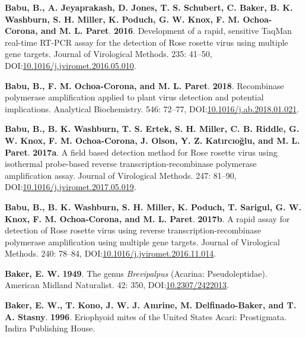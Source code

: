 \documentclass[12pt,final,CPage]{ufthesis}
\newlength{\cslhangindent}
\newenvironment{CSLReferences}[2] %
{%
	\setlength{\parindent}{0pt}
	\ifodd #1 \everypar{\setlength{\hangindent}{\cslhangindent}}\ignorespaces\fi
	\ifnum #2 > 0
	\setlength{\parskip}{#2\baselineskip}
	\fi
}%
{}
\begin{document}
{\begin{CSLReferences}{1}{0}
  \leavevmode{}%
  \textbf{Babu, B., A. Jeyaprakash, D. Jones, T. S. Schubert, C. Baker, B. K. Washburn, S. H. Miller, K. Poduch, G. W. Knox, F. M. Ochoa-Corona, and M. L. Paret}. \textbf{2016}. Development of a rapid, sensitive {TaqMan} real-time {RT}-{PCR} assay for the detection of {Rose rosette virus} using multiple gene targets. Journal of Virological Methods. 235: 41--50, DOI:\href{https://doi.org/10.1016/j.jviromet.2016.05.010}{10.1016/j.jviromet.2016.05.010}.

  \leavevmode{}%
  \textbf{Babu, B., F. M. Ochoa-Corona, and M. L. Paret}. \textbf{2018}. Recombinase polymerase amplification applied to plant virus detection and potential implications. Analytical Biochemistry. 546: 72--77, DOI:\href{https://doi.org/10.1016/j.ab.2018.01.021}{10.1016/j.ab.2018.01.021}.

  \leavevmode{}%
  \textbf{Babu, B., B. K. Washburn, T. S. Ertek, S. H. Miller, C. B. Riddle, G. W. Knox, F. M. Ochoa-Corona, J. Olson, Y. Z. Katırcıoğlu, and M. L. Paret}. \textbf{2017a}. A field based detection method for {Rose rosette virus} using isothermal probe-based reverse transcription-recombinase polymerase amplification assay. Journal of Virological Methods. 247: 81--90, DOI:\href{https://doi.org/10.1016/j.jviromet.2017.05.019}{10.1016/j.jviromet.2017.05.019}.

  \leavevmode{}%
  \textbf{Babu, B., B. K. Washburn, S. H. Miller, K. Poduch, T. Sarigul, G. W. Knox, F. M. Ochoa-Corona, and M. L. Paret}. \textbf{2017b}. A rapid assay for detection of {Rose rosette virus} using reverse transcription-recombinase polymerase amplification using multiple gene targets. Journal of Virological Methods. 240: 78--84, DOI:\href{https://doi.org/10.1016/j.jviromet.2016.11.014}{10.1016/j.jviromet.2016.11.014}.

  \leavevmode{}%
  \textbf{Baker, E. W.} \textbf{1949}. The genus {\emph{Brevipalpus}} ({Acarina}: {Pseudoleptidae}). American Midland Naturalist. 42: 350, DOI:\href{https://doi.org/10.2307/2422013}{10.2307/2422013}.

  \leavevmode{}%
  \textbf{Baker, E. W., T. Kono, J. W. J. Amrine, M. Delfinado-Baker, and T. A. Stasny}. \textbf{1996}. Eriophyoid mites of the {United States} {Acari}: {Prostigmata}. Indira Publishing House.


\end{CSLReferences}}
\end{document}
